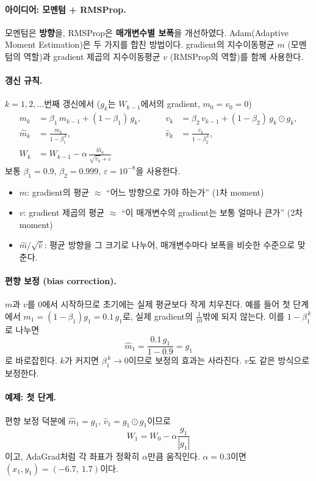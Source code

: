 \documentclass[11pt,a4paper]{article}
\begin{document}
\paragraph{아이디어: 모멘텀 + RMSProp.}
모멘텀은 \textbf{방향}을, RMSProp은 \textbf{매개변수별 보폭}을 개선하였다.
Adam(Adaptive Moment Estimation)은 두 가지를 합친 방법이다.
gradient의 지수이동평균 $m$ (모멘텀의 역할)과 gradient 제곱의 지수이동평균 $v$ (RMSProp의 역할)를 함께 사용한다.

\paragraph{갱신 규칙.}
$k=1,2,\ldots$번째 갱신에서 ($g_k$는 $W_{k-1}$에서의 gradient, $m_0=v_0=0$)
\[
\boxed{
\begin{aligned}
m_k&=\beta_1\,m_{k-1}+(1-\beta_1)\,g_k,
&\qquad
v_k&=\beta_2\,v_{k-1}+(1-\beta_2)\,g_k\odot g_k,\\[4pt]
\hat m_k&=\frac{m_k}{1-\beta_1^{\,k}},
&\qquad
\hat v_k&=\frac{v_k}{1-\beta_2^{\,k}},\\[4pt]
W_k&=W_{k-1}-\alpha\,\frac{\hat m_k}{\sqrt{\hat v_k}+\varepsilon}
\end{aligned}
}
\]
보통 $\beta_1=0.9$, $\beta_2=0.999$, $\varepsilon=10^{-8}$을 사용한다.
\begin{itemize}[leftmargin=1.8em]
\item $m$: gradient의 평균 $\approx$ ``어느 방향으로 가야 하는가'' (1차 moment)
\item $v$: gradient 제곱의 평균 $\approx$ ``이 매개변수의 gradient는 보통 얼마나 큰가'' (2차 moment)
\item $\hat m/\sqrt{\hat v}$: 평균 방향을 그 크기로 나누어, 매개변수마다 보폭을 비슷한 수준으로 맞춘다.
\end{itemize}

\paragraph{편향 보정 (bias correction).}
$m$과 $v$를 $0$에서 시작하므로 초기에는 실제 평균보다 작게 치우친다.
예를 들어 첫 단계에서 $m_1=(1-\beta_1)g_1=0.1\,g_1$로, 실제 gradient의 $\frac{1}{10}$밖에 되지 않는다.
이를 $1-\beta_1^{\,k}$로 나누면
\[
\hat m_1=\frac{0.1\,g_1}{1-0.9}=g_1
\]
로 바로잡힌다. $k$가 커지면 $\beta_1^{\,k}\to0$이므로 보정의 효과는 사라진다.
$v$도 같은 방식으로 보정한다.

\paragraph{예제: 첫 단계.}
편향 보정 덕분에 $\hat m_1=g_1$, $\hat v_1=g_1\odot g_1$이므로
\[
W_1=W_0-\alpha\frac{g_1}{|g_1|}
\]
이고, AdaGrad처럼 각 좌표가 정확히 $\alpha$만큼 움직인다.
$\alpha=0.3$이면 $(x_1,y_1)=(-6.7,\ 1.7)$이다.
\end{document}
